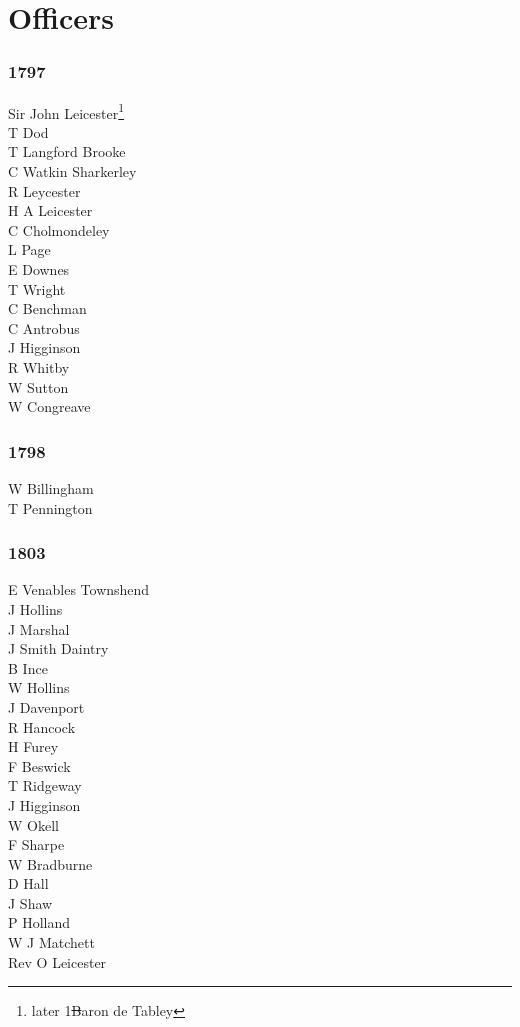 \chapter*{Officers}

\vspace{20mm}

\small

\begin{multicols}{3}
  \noindent
  \subsection*{1797}
  Sir John Leicester\footnote{later 1\st Baron de Tabley} \\
  T Dod \\
  T Langford Brooke \\
  C Watkin Sharkerley \\
  R Leycester \\
  H A Leicester \\
  C Cholmondeley \\
  L Page \\
  E Downes \\
  T Wright \\
  C Benchman \\
  C Antrobus \\
  J Higginson \\
  R Whitby \\
  W Sutton \\
  W Congreave \\
  \subsection*{1798}
  W Billingham \\
  T Pennington \\
  \subsection*{1803}
  E Venables Townshend \\
  J Hollins \\
  J Marshal \\
  J Smith Daintry \\
  B Ince \\
  W Hollins \\
  J Davenport \\
  R Hancock \\
  H Furey \\
  F Beswick \\
  T Ridgeway \\
  J Higginson \\
  W Okell \\
  F Sharpe \\
  W Bradburne \\
  D Hall \\
  J Shaw \\
  P Holland \\
  W J Matchett \\
  Rev O Leicester \\

\end{multicols}
